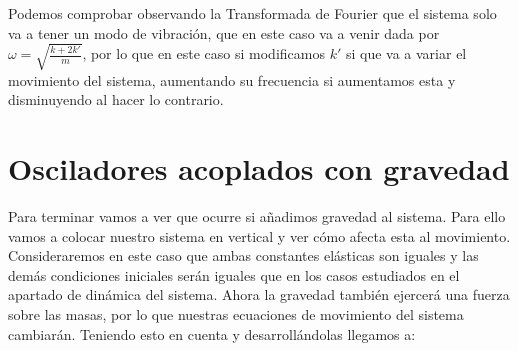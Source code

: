\documentclass{article}
\begin{document}
Podemos comprobar observando la Transformada de Fourier que el sistema solo va a tener un modo de vibración, que en este caso va a venir dada por $\omega =\sqrt{\frac{k+2k'}{m}}$, por lo que en este caso si modificamos $k'$ si que va a variar el movimiento del sistema, aumentando su frecuencia si aumentamos esta y disminuyendo al hacer lo contrario.
\section{Osciladores acoplados con gravedad}
Para terminar vamos a ver que ocurre si añadimos gravedad al sistema. Para ello vamos a colocar nuestro sistema en vertical y ver cómo afecta esta al movimiento. Consideraremos en este caso que ambas constantes elásticas son iguales y las demás condiciones iniciales serán iguales que en los casos estudiados en el apartado de dinámica del sistema.\newline\linebreak
Ahora la gravedad también ejercerá una fuerza sobre las masas, por lo que nuestras ecuaciones de movimiento del sistema cambiarán. Teniendo esto en cuenta y desarrollándolas llegamos a:
\end{document}
